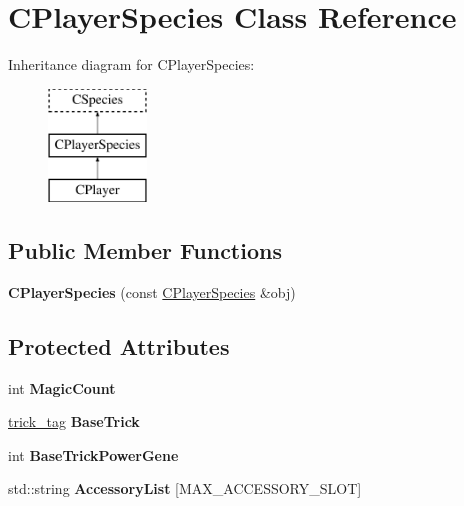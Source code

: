 \hypertarget{class_c_player_species}{}\section{C\+Player\+Species Class Reference}
\label{class_c_player_species}
Inheritance diagram for C\+Player\+Species\+:\begin{figure}[H]
\begin{center}
\leavevmode
\includegraphics[height=3.000000cm]{class_c_player_species}
\end{center}
\end{figure}
\subsection*{Public Member Functions}
\begin{DoxyCompactItemize}
\item 
{\bfseries C\+Player\+Species} (const \hyperlink{class_c_player_species}{C\+Player\+Species} \&obj)\hypertarget{class_c_player_species_ad79929e7940087a6725f58b227afb027}{}\label{class_c_player_species_ad79929e7940087a6725f58b227afb027}

\end{DoxyCompactItemize}
\subsection*{Protected Attributes}
\begin{DoxyCompactItemize}
\item 
int {\bfseries Magic\+Count}\hypertarget{class_c_player_species_aaf73192bfdffa9a5bc6003f049a8edf4}{}\label{class_c_player_species_aaf73192bfdffa9a5bc6003f049a8edf4}

\item 
\hyperlink{structtrick__tag}{trick\+\_\+tag} {\bfseries Base\+Trick}\hypertarget{class_c_player_species_a2e68bce8c6d6db92809af315292fe760}{}\label{class_c_player_species_a2e68bce8c6d6db92809af315292fe760}

\item 
int {\bfseries Base\+Trick\+Power\+Gene}\hypertarget{class_c_player_species_ae49ffba3c0a43c008acc5dbe4a866f0f}{}\label{class_c_player_species_ae49ffba3c0a43c008acc5dbe4a866f0f}

\item 
std\+::string {\bfseries Accessory\+List} \mbox{[}M\+A\+X\+\_\+\+A\+C\+C\+E\+S\+S\+O\+R\+Y\+\_\+\+S\+L\+OT\mbox{]}\hypertarget{class_c_player_species_a77116b28f1f04ff5642b2c583d6a35d3}{}\label{class_c_player_species_a77116b28f1f04ff5642b2c583d6a35d3}

\end{DoxyCompactItemize}
